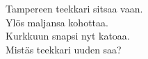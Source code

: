 
Tampereen teekkari sitsaa vaan. \\ Ylös maljansa kohottaa. \\ Kurkkuun snapsi nyt katoaa. \\ Mistäs teekkari uuden saa?